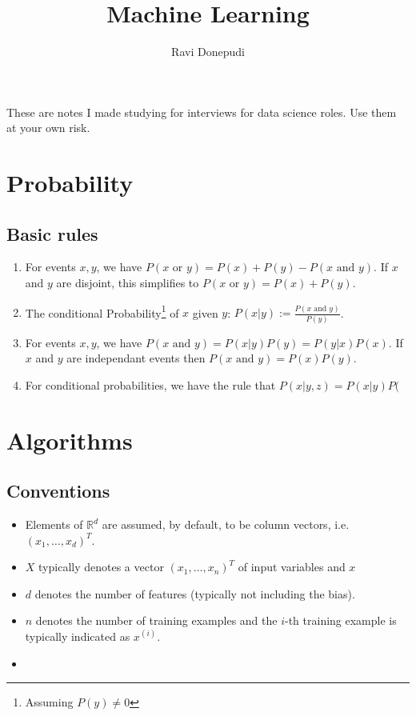 \documentclass[a4paper]{article}
\title{Machine Learning}
\author{Ravi Donepudi}
\newcommand{\RR}{\mathbb{R}}
\begin{document}
\maketitle
These are notes I made studying for interviews for data science roles. Use them at your own risk. 
\section{Probability}
\subsection{Basic rules}

\begin{enumerate}
    \item For events $x,y$, we have $P(x \text{ or } y)=P(x)+P(y)-P(x \text{ and } y)$. If $x$ and $y$ are disjoint, this simplifies to  $P(x\text{ or } y ) = P(x)+P(y)$.
    \item The conditional Probability\footnote{Assuming $P(y)\neq 0$} of $x$ given $y$: $P(x|y):= \frac{P(x \text{ and } y)}{P(y)} $.
    \item For events $x,y$, we have $P(x \text{ and } y) = P(x|y)P(y) = P(y|x)P(x)$. If $x$ and $y$ are independant events then $P(x \text{ and } y) = P(x)P(y)$.
    \item For conditional probabilities, we have the rule that $P(x|y,z) = P(x|y)P($
    
\end{enumerate}

\section{Algorithms}
\subsection{Conventions}
\begin{itemize}
    \item Elements of $\RR^d$ are assumed, by default, to be column vectors, i.e. $(x_1,\ldots, x_d)^T$.
    \item $X$ typically denotes a vector $(x_1,\ldots, x_n)^T$ of input variables and $x$
    \item $d$ denotes the number of features (typically not including the bias).
    \item $n$ denotes the number of training examples and the $i$-th training example is typically indicated as $x^(i)$.
    \item 
\end{itemize}
\end{document}
